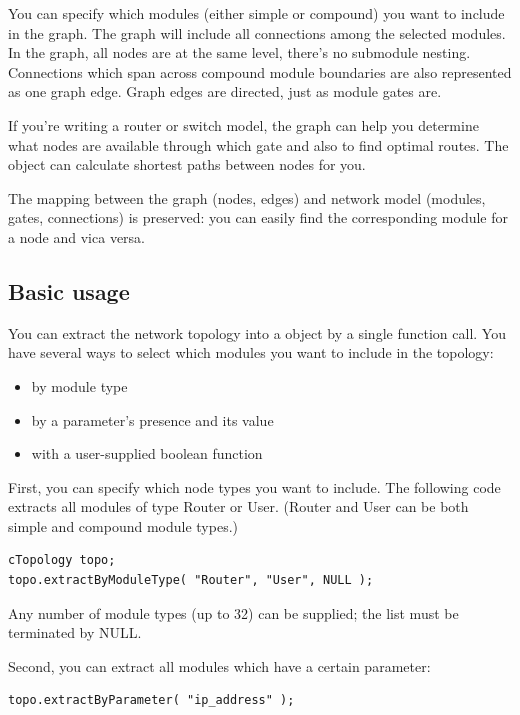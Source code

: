 You can specify which modules (either simple or compound) you want to
include in the graph. The graph will include all connections among the
selected modules. In the graph, all nodes are at the same level,
there's no submodule nesting.  Connections which span across compound
module boundaries are also represented as one graph edge. Graph edges
are directed, just as module gates are.


If you're writing a router or switch model, the 
graph can help you determine what nodes are available through which
gate and also to find optimal routes. The
 object can calculate shortest paths between nodes for you.

The mapping between the graph (nodes, edges) and network model 
(modules, gates, connections) is preserved: you can easily find 
the corresponding module for a  node and vica versa.





\subsection{Basic usage}

You can extract the network topology into a 
object by a single function call. You have several ways to select
which modules you want to include in the topology:
\begin{itemize}
  \item{by module type}
  \item{by a parameter's presence and its value}
  \item{with a user-supplied boolean function}
\end{itemize}

First, you can specify which node types you want to include. The
following code extracts all modules of type Router or User. (Router
and User can be both simple and compound module types.)

\begin{Verbatim}
cTopology topo;
topo.extractByModuleType( "Router", "User", NULL );
\end{Verbatim}


Any number of module types (up to 32) can be supplied; the list 
must be terminated by NULL.

Second, you can extract all modules which have a certain parameter:

\begin{Verbatim}
topo.extractByParameter( "ip_address" );
\end{Verbatim}


